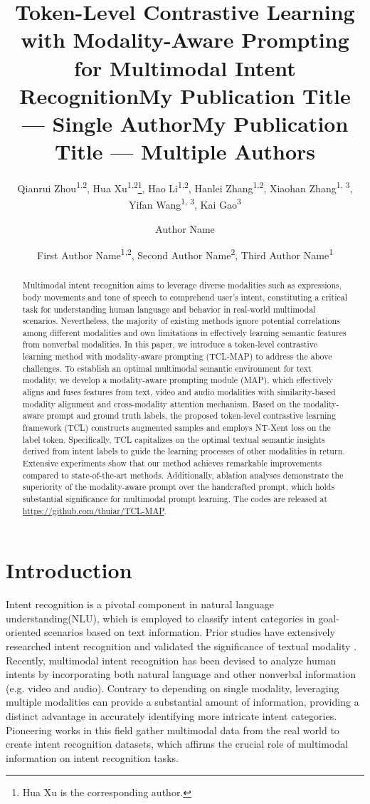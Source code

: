 \documentclass[letterpaper]{article}
\title{Token-Level Contrastive Learning with Modality-Aware Prompting for Multimodal Intent Recognition}
\author{
Qianrui Zhou\textsuperscript{\rm 1,\rm 2},
Hua Xu\textsuperscript{\rm 1,\rm 2}\footnote{Hua Xu is the corresponding author.},
Hao Li\textsuperscript{\rm 1,\rm 2},
Hanlei Zhang\textsuperscript{\rm 1,\rm 2},
Xiaohan Zhang\textsuperscript{\rm 1, \rm 3},
Yifan Wang\textsuperscript{\rm 1, \rm 3},
Kai Gao\textsuperscript{\rm 3}
}
\title{My Publication Title --- Single Author}
\author {
Author Name
}
\title{My Publication Title --- Multiple Authors}
\author {
First Author Name\textsuperscript{\rm 1,\rm 2},
Second Author Name\textsuperscript{\rm 2},
Third Author Name\textsuperscript{\rm 1}
}
\begin{document}
\maketitle

\begin{abstract}
Multimodal intent recognition aims to leverage diverse modalities such as expressions, body movements and tone of speech to comprehend user's intent, constituting a critical task for understanding human language and behavior in real-world multimodal scenarios. Nevertheless, the majority of existing methods ignore potential correlations among different modalities and own limitations in effectively learning semantic features from nonverbal modalities. In this paper, we introduce a token-level contrastive learning method with modality-aware prompting (TCL-MAP) to address the above challenges. To establish an optimal multimodal semantic environment for text modality, we develop a modality-aware prompting module (MAP), which effectively aligns and fuses features from text, video and audio modalities with similarity-based modality alignment and cross-modality attention mechanism. Based on the modality-aware prompt and ground truth labels, the proposed token-level contrastive learning framework (TCL) constructs augmented samples and employs NT-Xent loss on the label token. Specifically, TCL capitalizes on the optimal textual semantic insights derived from intent labels to guide the learning processes of other modalities in return. Extensive experiments show that our method achieves remarkable improvements compared to state-of-the-art methods. Additionally, ablation analyses demonstrate the superiority of the modality-aware prompt over the handcrafted prompt, which holds substantial significance for multimodal prompt learning. The codes are released at \url{https://github.com/thuiar/TCL-MAP}.

\end{abstract}

\section{Introduction}

Intent recognition is a pivotal component in natural language understanding(NLU), which is employed to classify intent categories in goal-oriented scenarios based on text information. Prior studies have extensively researched intent recognition and validated the significance of textual modality \cite{zhang2021textoir, zhang2021discovering}. Recently, multimodal intent recognition has been devised to analyze human intents by incorporating both natural language and other nonverbal information (e.g. video and audio). Contrary to depending on single modality, leveraging multiple modalities can provide a substantial amount of information, providing a distinct advantage in accurately identifying more intricate intent categories. Pioneering works in this field \cite{10.1145/3503161.3547906, saha-etal-2020-towards} gather multimodal data from the real world to create intent recognition datasets, which affirms the crucial role of multimodal information on intent recognition tasks.
\end{document}
